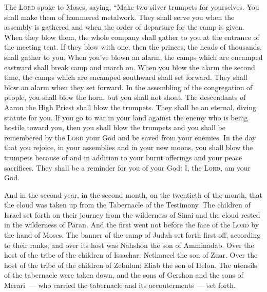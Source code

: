 
\begin{inparaenum}
   The \textsc{Lord} spoke to Moses, saying,%
   ``Make two silver trumpets for yourselves. You shall make them of hammered metalwork. They shall serve you when the assembly is gathered and when the order of departure for the camp is given.%
   When they blow them, the whole company shall gather to you at the entrance of the meeting tent.%
   If they blow with one, then the princes, the heads of thousands, shall gather to you.%
   When you've blown an alarm, the camps which are encamped eastward shall break camp and march on.%
   When you blow the alarm the second time, the camps which are encamped southward shall set forward. They shall blow an alarm when they set forward.%
   In the assembling of the congregation of people, you shall blow the horn, but you shall not shout.%
   The descendants of Aaron the High Priest shall blow the trumpets. They shall be an eternal, diving statute for you.%
   If you go to war in your land against the enemy who is being hostile toward you, then you shall blow the trumpets and you shall be remembered by the \textsc{Lord} your God and be saved from your enemies.%
   In the day that you rejoice, in your assemblies and in your new moons, you shall blow the trumpets because of and in addition to your burnt offerings and your peace sacrifices. They shall be a reminder for you of your God: I, the \textsc{Lord}, am your God.%
  
   And in the second year, in the second month, on the twentieth of the month, that the cloud was taken up from the Tabernacle of the Testimony.%
   The children of Israel set forth on their journey from the wilderness of Sinai and the cloud rested in the wilderness of Paran.%
   And the first went not before the face of the \textsc{Lord} by the hand of Moses.%
   The banner of the camp of Judah set forth first off, according to their ranks; and over its host was Nahshon the son of Amminadab.%
   Over the host of the tribe of the children of Issachar: Nethaneel the son of Zuar.%
   Over the host of the tribe of the children of Zebulun: Eliab the son of Helon.%
   The utensils of the tabernacle were taken down, and the sons of Gershon and the sons of Merari~--- who carried the tabernacle and its accouterments~--- set forth.%
  

\end{inparaenum}
